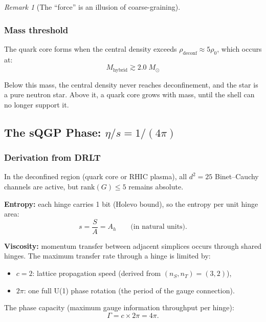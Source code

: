 \documentclass[12pt]{article}
\theoremstyle{remark}
\newtheorem{remark}[theorem]{Remark}
\theoremstyle{definition}
\begin{document}
\begin{remark}[The ``force'' is an illusion of coarse-graining]
\subsubsection{Mass threshold}

The quark core forms when the central density exceeds $\rho_\text{deconf} \approx 5\rho_0$, which occurs at:
\begin{equation}
M_\text{hybrid} \gtrsim 2.0\;M_\odot
\end{equation}

Below this mass, the central density never reaches deconfinement, and the star is a pure neutron star. Above it, a quark core grows with mass, until the shell can no longer support it.

\subsection{The sQGP Phase: $\eta/s = 1/(4\pi)$}

\subsubsection{Derivation from DRLT}

In the deconfined region (quark core or RHIC plasma), all $d^2 = 25$ Binet--Cauchy channels are active, but $\text{rank}(G) \leq 5$ remains absolute.

\textbf{Entropy:} each hinge carries 1 bit (Holevo bound), so the entropy per unit hinge area:
\begin{equation}
s = \frac{S}{A} = A_h \qquad \text{(in natural units)}.
\end{equation}

\textbf{Viscosity:} momentum transfer between adjacent simplices occurs through shared hinges. The maximum transfer rate through a hinge is limited by:
\begin{itemize}
\item $c = 2$: lattice propagation speed (derived from $(n_S, n_T) = (3, 2)$),
\item $2\pi$: one full U(1) phase rotation (the period of the gauge connection).
\end{itemize}

The phase capacity (maximum gauge information throughput per hinge):
\begin{equation}
\Gamma = c \times 2\pi = 4\pi.
\end{equation}


\end{remark}
\end{document}
